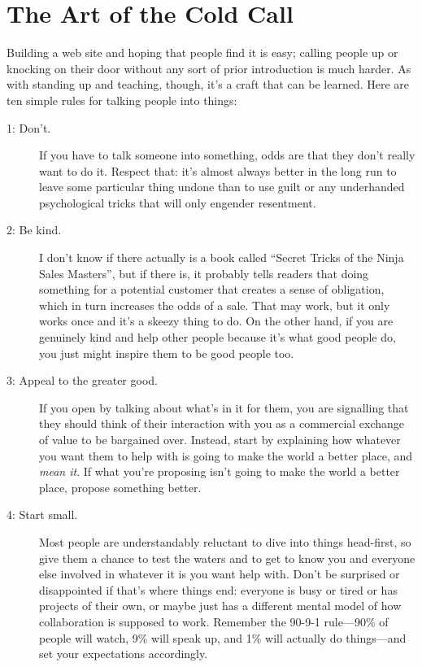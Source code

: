 \section{The Art of the Cold Call}\label{s:marketing-cold-call}

Building a web site and hoping that people find it is easy;
calling people up or knocking on their door without any sort of prior introduction
is much harder.
As with standing up and teaching,
though,
it's a craft that can be learned.
Here are ten simple rules for talking people into things:

\begin{description}

  \item[1: Don't.]
    If you have to talk someone into something,
    odds are that they don't really want to do it.
    Respect that:
    it's almost always better in the long run to leave some particular thing undone
    than to use guilt or any underhanded psychological tricks that will only engender resentment.

  \item[2: Be kind.]
    I don't know if there actually is a book called
    ``Secret Tricks of the Ninja Sales Masters'',
    but if there is,
    it probably tells readers that doing something for a potential customer
    that creates a sense of obligation,
    which in turn increases the odds of a sale.
    That may work, but it only works once and it's a skeezy thing to do.
    On the other hand,
    if you are genuinely kind
    and help other people because it's what good people do,
    you just might inspire them to be good people too.

  \item[3: Appeal to the greater good.]
    If you open by talking about what's in it for them,
    you are signalling that they should think of their interaction with you
    as a commercial exchange of value to be bargained over.
    Instead,
    start by explaining how whatever you want them to help with is going to make the world a better place,
    and \emph{mean it}.
    If what you're proposing isn't going to make the world a better place,
    propose something better.

  \item[4: Start small.]
    Most people are understandably reluctant to dive into things head-first,
    so give them a chance to test the waters
    and to get to know you and everyone else involved in
    whatever it is you want help with.
    Don't be surprised or disappointed if that's where things end:
    everyone is busy or tired or has projects of their own,
    or maybe just has a different mental model of how collaboration is supposed to work.
    Remember the 90-9-1 rule---90\% of people will watch,
    9\% will speak up,
    and 1\% will actually do things---and set your expectations accordingly.


\end{description}
